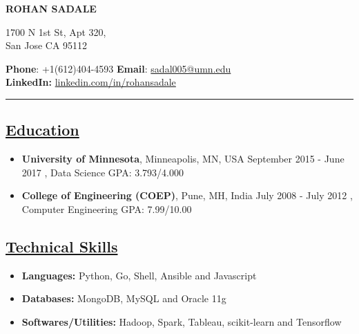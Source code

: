 \documentclass[10pt]{article}
\begin{document}

 

\begin{center}
\bfseries {\huge {\selectfont ROHAN SADALE}}
\end{center}

\vspace{14pt}

\noindent \begin{minipage}[b]{0.3\hsize}
\normalsize 1700 N 1st St, Apt 320, \\
\normalsize San Jose CA 95112
\end{minipage}
\hfill
\begin{minipage}[b]{0.50 \hsize}
{\bfseries {\normalsize Phone}}: {\normalsize {+1(612)404-4593}} \hspace{0.15in} {\bfseries {\normalsize Email}}: {\normalsize \url{sadal005@umn.edu}} \\
{\bfseries {\normalsize LinkedIn:}} \normalsize \url{linkedin.com/in/rohansadale}
\end{minipage}

\vspace{4pt}

\hrule
\vspace{-0.2cm}
\subsection*{\underline{Education}}
\vspace{-0.1cm}
\begin{itemize}[leftmargin=*]
\item[] {\bfseries University of Minnesota}, Minneapolis, MN, USA \hfill September 2015 - June 2017
, Data Science \hspace{0.2in} GPA: 3.793/4.000 
\vspace{-0.1cm}
\item[] {\bfseries College of Engineering (COEP)}, Pune, MH, India \hfill July 2008 - July 2012  
, Computer Engineering	 \hspace{0.2in} GPA: 7.99/10.00
\end{itemize}

\subsection*{\underline{Technical Skills}}
\vspace{-0.1cm}
\begin{itemize}[leftmargin=*]
 \item[]  \textbf{Languages:}  Python, Go, Shell, Ansible and Javascript
 \vspace{-0.22cm}
 \item[]   \textbf{Databases:}  MongoDB, MySQL and Oracle 11g
  \vspace{-0.22cm}
   \item[]   \textbf{Softwares/Utilities:} Hadoop, Spark, Tableau, scikit-learn and Tensorflow
\end{itemize}
\end{document}
